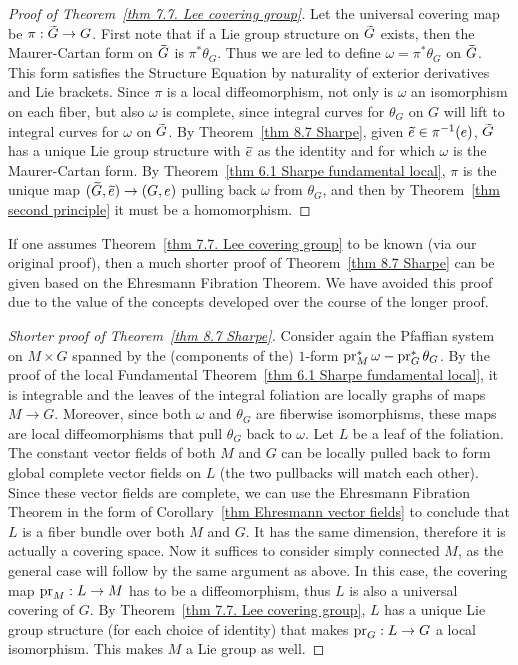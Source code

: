 \begin{proof}[Proof of Theorem~\ref{thm 7.7. Lee covering group}]
    Let the universal covering map be $\pi:\wt{G}\to G$. First note that if a Lie group structure on $\wt{G}$ exists, then the Maurer-Cartan form on $\wt{G}$ is $\pi^\ast \theta_G$. Thus we are led to define $\omega=\pi^\ast\theta_G$ on $\wt{G}$. This form satisfies the Structure Equation by naturality of exterior derivatives and Lie brackets. Since $\pi$ is a local diffeomorphism, not only is $\omega$ an isomorphism on each fiber, but also $\omega$ is complete, since integral curves for $\theta_G$ on $G$ will lift to integral curves for $\omega$ on $\wt{G}$. By Theorem~\ref{thm 8.7 Sharpe}, given $\wt{e}\in \pi^{-1}(e)$, $\wt{G}$ has a unique Lie group structure with $\wt e$ as the identity and for which $\omega$ is the Maurer-Cartan form. By Theorem~\ref{thm 6.1 Sharpe fundamental local}, $\pi$ is the unique map $(\wt{G},\wt{e})\to (G,e)$ pulling back $\omega$ from $\theta_G$, and then by Theorem~\ref{thm second principle} it must be a homomorphism.
\end{proof}

If one assumes Theorem~\ref{thm 7.7. Lee covering group} to be known (via our original proof), then a much shorter proof of Theorem~\ref{thm 8.7 Sharpe} can be given based on the Ehresmann Fibration Theorem. We have avoided this proof due to the value of the concepts developed over the course of the longer proof.

\begin{proof}[Shorter proof of Theorem~\ref{thm 8.7 Sharpe}]
    Consider again the Pfaffian system on $M\times G$ spanned by the (components of the) $1$-form $\operatorname{pr}_M^\ast\omega-\operatorname{pr}_G^\ast\theta_G$. By the proof of the local Fundamental Theorem~\ref{thm 6.1 Sharpe fundamental local}, it is integrable and the leaves of the integral foliation are locally graphs of maps $M\to G$. Moreover, since both $\omega$ and $\theta_G$ are fiberwise isomorphisms, these maps are local diffeomorphisms that pull $\theta_G$ back to $\omega$. Let $L$ be a leaf of the foliation. The constant vector fields of both $M$ and $G$ can be locally pulled back to form global complete vector fields on $L$ (the two pullbacks will match each other). Since these vector fields are complete, we can use the Ehresmann Fibration Theorem in the form of Corollary~\ref{thm Ehresmann vector fields} to conclude that $L$ is a fiber bundle over both $M$ and $G$. It has the same dimension, therefore it is actually a covering space. Now it suffices to consider simply connected $M$, as the general case will follow by the same argument as above. In this case, the covering map $\operatorname{pr}_M:L\to M$ has to be a diffeomorphism, thus $L$ is also a universal covering of $G$. By Theorem~\ref{thm 7.7. Lee covering group}, $L$ has a unique Lie group structure (for each choice of identity) that makes $\operatorname{pr}_G:L\to G$ a local isomorphism. This makes $M$ a Lie group as well.
\end{proof}








